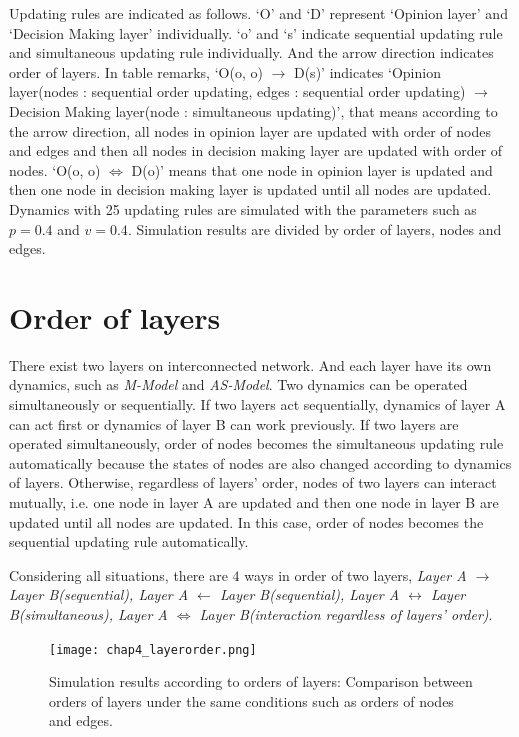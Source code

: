 Updating rules are indicated as follows. `O' and `D'  represent `Opinion layer' and `Decision Making layer' individually. `o' and `s' indicate sequential updating rule and simultaneous updating rule individually. And the arrow direction indicates order of layers. In table remarks, `O(o, o) $\to$ D(s)' indicates `Opinion layer(nodes : sequential order updating, edges : sequential order updating) $\to$ Decision Making layer(node : simultaneous updating)', that means according to the arrow direction, all nodes in opinion layer are updated with order of nodes and edges and then all nodes in decision making layer are updated with order of nodes. `O(o, o) $\Leftrightarrow$ D(o)' means that one node in opinion layer is updated and then one node in decision making layer is updated until all nodes are updated. Dynamics with 25 updating rules are simulated with the parameters such as $p=0.4$ and $v=0.4$. Simulation results are divided by order of layers, nodes and edges. \\

\section{Order of layers}
There exist two layers on interconnected network. And each layer have its own dynamics, such as \textit{M-Model} and \textit{AS-Model}. Two dynamics can be operated simultaneously or sequentially. If two layers act sequentially, dynamics of layer A can act first or dynamics of layer B can work previously. If two layers are operated simultaneously, order of nodes becomes the simultaneous updating rule automatically because the states of nodes are also changed according to dynamics of layers. Otherwise, regardless of layers' order, nodes of two layers can interact mutually, i.e. one node in layer A are updated and then one node in layer B are updated until all nodes are updated. In this case, order of nodes becomes the sequential updating rule automatically.

Considering all situations, there are $4$ ways in order of two layers, \textit{Layer A $\to$ Layer B(sequential), Layer A $\leftarrow$ Layer B(sequential), Layer A $\leftrightarrow$ Layer B(simultaneous), Layer A $\Leftrightarrow$ Layer B(interaction regardless of layers' order)}. 

\begin{figure}[!htb]
	\centering
	\texttt{[image: chap4\_layerorder.png]}
	\caption{Simulation results according to orders of layers: Comparison between orders of layers under the same conditions such as orders of nodes and edges.}
	\label{chap4_layerorder}
\end{figure}

